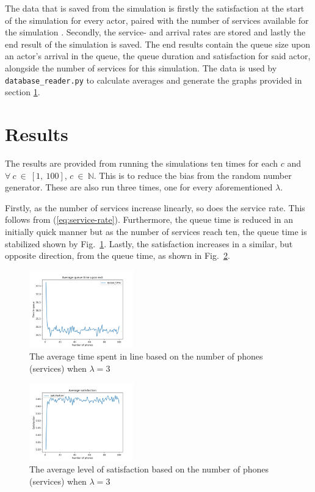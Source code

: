 \documentclass[conference]{IEEEtran}
\begin{document}
The data that is saved from the simulation is firstly the
satisfaction at the start of the simulation for every actor, paired
with the number of services available for the simulation
\cite{AvekvistLorentzonDta400}. Secondly, the service- and arrival
rates are stored and lastly the end result of the simulation is
saved. The end results contain the queue size upon an actor's
arrival in the queue, the queue duration and satisfaction for said
actor, alongside the number of services for this simulation. The
data is used by \verb|database_reader.py| to calculate averages and
generate the graphs provided in section \ref{sec:results}.

\section{Results}
\label{sec:results}

The results are provided from running the simulations ten times
for each $c$ and $\forall~c~\in~[1,~100]$, $c~\in~\mathbb{N}$. This
is to reduce the bias from the random number generator. These are
also run three times, one for every aforementioned $\lambda$.

Firstly, as the number of services increase linearly, so does the
service rate. This follows from (\ref{eq:service-rate}).
Furthermore, the queue time is reduced in an initially quick manner
but as the number of services reach ten, the queue time is
stabilized shown by Fig.~\ref{fig:queue-time-3}. Lastly, the
satisfaction increases in a similar, but opposite direction, from
the queue time, as shown in Fig.~\ref{fig:satisfaction-3}.

\begin{figure}[htbp]
    \centerline{
        \includegraphics[width=0.4\textwidth]{
            figures/queue-time-3.png
        }
    }
    \caption{
        The average time spent in line based on the number of
        phones (services) when $\lambda = 3$
    }
    \label{fig:queue-time-3}
\end{figure}

\begin{figure}[htbp]
    \centerline{
        \includegraphics[width=0.4\textwidth]{
            figures/satisfaction-3.png
        }
    }
    \caption{
        The average level of satisfaction based on the number of
        phones (services) when $\lambda = 3$
    }
    \label{fig:satisfaction-3}
\end{figure}
\end{document}
